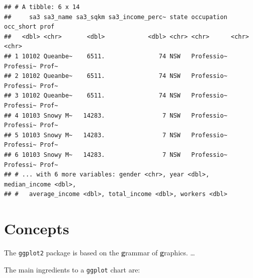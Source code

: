 \documentclass[]{book}
\newenvironment{Shaded}{\begin{snugshade}}{\end{snugshade}}
\newcommand{\CommentTok}[1]{\textcolor[rgb]{0.56,0.35,0.01}{\textit{#1}}}
\newcommand{\DecValTok}[1]{\textcolor[rgb]{0.00,0.00,0.81}{#1}}
\newcommand{\KeywordTok}[1]{\textcolor[rgb]{0.13,0.29,0.53}{\textbf{#1}}}
\newcommand{\NormalTok}[1]{#1}
\newcommand{\OperatorTok}[1]{\textcolor[rgb]{0.81,0.36,0.00}{\textbf{#1}}}
\newcommand{\StringTok}[1]{\textcolor[rgb]{0.31,0.60,0.02}{#1}}
\begin{document}
\begin{Shaded}
\end{Shaded}

\begin{verbatim}
## # A tibble: 6 x 14
##     sa3 sa3_name sa3_sqkm sa3_income_perc~ state occupation occ_short prof 
##   <dbl> <chr>       <dbl>            <dbl> <chr> <chr>      <chr>     <chr>
## 1 10102 Queanbe~    6511.               74 NSW   Professio~ Professi~ Prof~
## 2 10102 Queanbe~    6511.               74 NSW   Professio~ Professi~ Prof~
## 3 10102 Queanbe~    6511.               74 NSW   Professio~ Professi~ Prof~
## 4 10103 Snowy M~   14283.                7 NSW   Professio~ Professi~ Prof~
## 5 10103 Snowy M~   14283.                7 NSW   Professio~ Professi~ Prof~
## 6 10103 Snowy M~   14283.                7 NSW   Professio~ Professi~ Prof~
## # ... with 6 more variables: gender <chr>, year <dbl>, median_income <dbl>,
## #   average_income <dbl>, total_income <dbl>, workers <dbl>
\end{verbatim}

\hypertarget{concepts}{%
\section{Concepts}\label{concepts}}

The \texttt{ggplot2} package is based on the \textbf{g}rammar of \textbf{g}raphics. \ldots{}

The main ingredients to a \texttt{ggplot} chart are:
\end{document}
